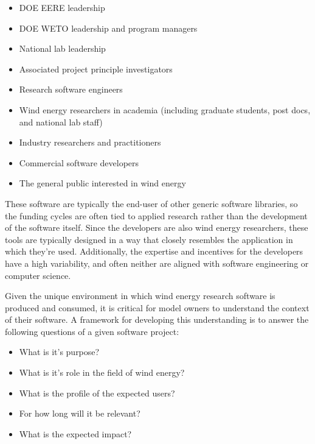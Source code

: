 \documentclass[]{nrel}
\begin{document}
\begin{itemize}
\item DOE EERE leadership

\item DOE WETO leadership and program managers

\item National lab leadership

\item Associated project principle investigators

\item Research software engineers

\item Wind energy researchers in academia
(including graduate students, post docs, and national lab staff)

\item Industry researchers and practitioners

\item Commercial software developers

\item The general public interested in wind energy

\end{itemize}

These software are typically the end-user of other generic software libraries, so
the funding cycles are often tied to applied research rather than the development of the
software itself. Since the developers are also wind energy researchers, these tools are
typically designed in a way that closely resembles the application in which they’re used.
Additionally, the expertise and incentives for the developers have a high variability, and
often neither are aligned with software engineering or computer science.

Given the unique environment in which wind energy research software is produced and consumed,
it is critical for model owners to understand the context of their software. A framework
for developing this understanding is to answer the following questions of a given software project:
\begin{itemize}
\item What is it’s purpose?

\item What is it’s role in the field of wind energy?

\item What is the profile of the expected users?

\item For how long will it be relevant?

\item What is the expected impact?

\end{itemize}
\end{document}
